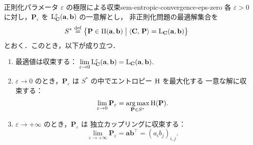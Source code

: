 \begin{theorem}{正則化パラメータ $\varepsilon$ の極限による収束}{sem-entropic-convergence-eps-zero}
  各 $\varepsilon > 0$ に対し，$\mathbf{P}_\varepsilon$ を
  $\mathrm{L}_{\mathbf{C}}^\varepsilon(\mathbf{a}, \mathbf{b})$ の一意解とし，
  非正則化問題の最適解集合を
  \[
    S^* \overset{\mathrm{def}}{=} \bigl\{ \mathbf{P} \in \Pi(\mathbf{a},\mathbf{b}) \bigm|
      \langle \mathbf{C},\, \mathbf{P} \rangle = \mathrm{L}_{\mathbf{C}}(\mathbf{a},\mathbf{b}) \bigr\}
  \]
  とおく．このとき，以下が成り立つ．

  \begin{enumerate}
    \item[(i)]
      最適値は収束する：
      $\displaystyle
        \lim_{\varepsilon \to 0}
        \mathrm{L}_{\mathbf{C}}^\varepsilon(\mathbf{a},\mathbf{b})
        =
        \mathrm{L}_{\mathbf{C}}(\mathbf{a},\mathbf{b}).
      $
    \item[(ii)]
      $\varepsilon \to 0$ のとき，$\mathbf{P}_\varepsilon$ は
      $S^*$ の中でエントロピー $\mathrm{H}$ を最大化する
      一意な解に収束する：
      \[
        \lim_{\varepsilon \to 0} \mathbf{P}_\varepsilon
        =
        \operatorname*{arg\,max}_{\mathbf{P} \in S^*} \mathrm{H}(\mathbf{P}).
      \]
    \item[(iii)]
      $\varepsilon \to +\infty$ のとき，$\mathbf{P}_\varepsilon$ は
      独立カップリングに収束する：
      \[
        \lim_{\varepsilon \to +\infty} \mathbf{P}_\varepsilon
        =
        \mathbf{a}\mathbf{b}^\top = (a_i b_j)_{i,j}.
      \]
  \end{enumerate}
\end{theorem}

